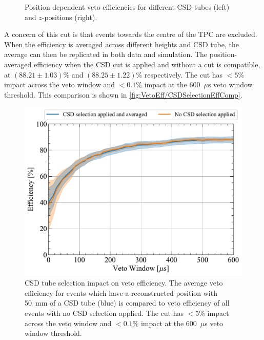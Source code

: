 \begin{enumerate}
\begin{figure}[!ht]
\begin{subfigure}[b]{0.49\textwidth}
            \caption{}
    		\label{fig:VetoEff/VetoEffPositionDependenceCSD}
    	\end{subfigure}
    	\caption[Position dependent veto efficiencies for different CSD tubes (left) and $z$-positions (right).]{Position dependent veto efficiencies for different CSD tubes (left) and $z$-positions (right).}
    	\label{fig:VetoEff/VetoEffPositionDependence}
    \end{figure}
	A concern of this cut is that events towards the centre of the TPC are excluded. When the efficiency is averaged across different heights and CSD tube, the average can then be replicated in both data and simulation. 
    The position-averaged efficiency when the CSD cut is applied and without a cut is compatible, at  $(88.21\pm1.03)\%$ and $(88.25\pm1.22)\%$ respectively.
	The cut has $<5\%$ impact across the veto window and $<0.1\%$ impact at the 600~$\mu$s veto window threshold. This comparison is shown in \autoref{fig:VetoEff/CSDSelectionEffComp}.
    \begin{figure}[!ht]
    	\centering
    	\includegraphics[width=0.7\linewidth]{figures/VetoEfficiency/CSDSelectionCheck.pdf}
    	\caption[CSD tube selection impact on veto efficiency.]{CSD tube selection impact on veto efficiency. The average veto efficiency for events which have a reconstructed position with 50~mm of a CSD tube (blue) is compared to veto efficiency of all events with no CSD selection applied. The cut has $<5\%$ impact across the veto window and $<0.1\%$ impact at the 600~$\mu$s veto window threshold.}
    	\label{fig:VetoEff/CSDSelectionEffComp}
    \end{figure}


\end{enumerate}
